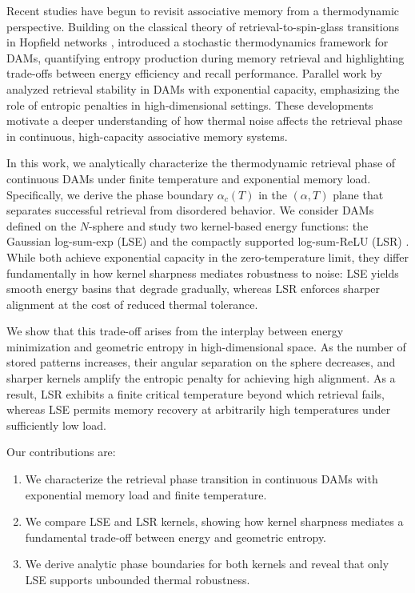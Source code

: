 \documentclass{article}
\theoremstyle{plain}
\theoremstyle{definition}
\theoremstyle{remark}
\begin{document}
Recent studies have begun to revisit associative memory from a thermodynamic perspective. Building on the classical theory of retrieval-to-spin-glass transitions in Hopfield networks \citep{amit1987statistical}, \citet{rooke2026stochastic} introduced a stochastic thermodynamics framework for DAMs, quantifying entropy production during memory retrieval and highlighting trade-offs between energy efficiency and recall performance. Parallel work by \citet{lucibello2024exponential} analyzed retrieval stability in DAMs with exponential capacity, emphasizing the role of entropic penalties in high-dimensional settings. These developments motivate a deeper understanding of how thermal noise affects the retrieval phase in continuous, high-capacity associative memory systems.

In this work, we analytically characterize the thermodynamic retrieval phase of continuous DAMs under finite temperature and exponential memory load. Specifically, we derive the phase boundary $\alpha_c(T)$ in the $(\alpha, T)$ plane that separates successful retrieval from disordered behavior. We consider DAMs defined on the $N$-sphere and study two kernel-based energy functions: the Gaussian log-sum-exp (LSE) and the compactly supported log-sum-ReLU (LSR) \citep{hoover2025dense}. While both achieve exponential capacity in the zero-temperature limit, they differ fundamentally in how kernel sharpness mediates robustness to noise: LSE yields smooth energy basins that degrade gradually, whereas LSR enforces sharper alignment at the cost of reduced thermal tolerance.

We show that this trade-off arises from the interplay between energy minimization and geometric entropy in high-dimensional space. As the number of stored patterns increases, their angular separation on the sphere decreases, and sharper kernels amplify the entropic penalty for achieving high alignment. As a result, LSR exhibits a finite critical temperature beyond which retrieval fails, whereas LSE permits memory recovery at arbitrarily high temperatures under sufficiently low load.

Our contributions are:
\begin{enumerate}
    \item We characterize the retrieval phase transition in continuous DAMs with exponential memory load and finite temperature.
    \item We compare LSE and LSR kernels, showing how kernel sharpness mediates a fundamental trade-off between energy and geometric entropy.
    \item We derive analytic phase boundaries for both kernels and reveal that only LSE supports unbounded thermal robustness.
\end{enumerate}
\end{document}

